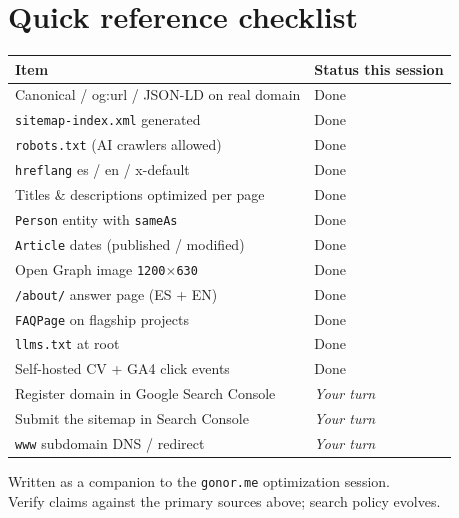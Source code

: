 \documentclass[11pt]{article}
\begin{document}
\section{Quick reference checklist}

\begin{center}
\renewcommand{\arraystretch}{1.35}
\begin{tabular}{@{}p{} l@{}}
\toprule
\textbf{Item} & \textbf{Status this session} \\
\midrule
Canonical / og:url / JSON-LD on real domain & Done \\
\texttt{sitemap-index.xml} generated & Done \\
\texttt{robots.txt} (AI crawlers allowed) & Done \\
\texttt{hreflang} es / en / x-default & Done \\
Titles \& descriptions optimized per page & Done \\
\texttt{Person} entity with \texttt{sameAs} & Done \\
\texttt{Article} dates (published / modified) & Done \\
Open Graph image \texttt{1200$\times$630} & Done \\
\texttt{/about/} answer page (ES + EN) & Done \\
\texttt{FAQPage} on flagship projects & Done \\
\texttt{llms.txt} at root & Done \\
Self-hosted CV + GA4 click events & Done \\
\midrule
Register domain in Google Search Console & \emph{Your turn} \\
Submit the sitemap in Search Console & \emph{Your turn} \\
\texttt{www} subdomain DNS / redirect & \emph{Your turn} \\
\bottomrule
\end{tabular}
\end{center}

\vfill
\begin{center}
\small\color{sage}
Written as a companion to the \texttt{gonor.me} optimization session.\\
Verify claims against the primary sources above; search policy evolves.
\end{center}
\end{document}
